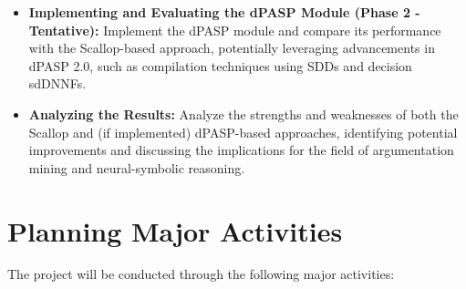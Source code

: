 \documentclass{article}
\begin{document}
\begin{itemize}
    \item \textbf{Implementing and Evaluating the dPASP Module (Phase 2 -
    Tentative):} Implement the dPASP module and compare its performance with
    the Scallop-based approach, potentially leveraging advancements in dPASP
    2.0, such as compilation techniques using SDDs and decision sdDNNFs.

    \item \textbf{Analyzing the Results:} Analyze the strengths and weaknesses
    of both the Scallop and (if implemented) dPASP-based approaches,
    identifying potential improvements and discussing the implications for the
    field of argumentation mining and neural-symbolic reasoning.
\end{itemize}

\section{Planning Major Activities}

The project will be conducted through the following major activities:
\end{document}
